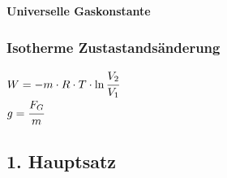 \textbf{Universelle Gaskonstante}\\
\begin{minipage}{0.45\textwidth}

\end{minipage}
\begin{minipage}{0.45\textwidth}


\end{minipage}


\subsubsection{Isotherme Zustastandsänderung}
\begin{minipage}{0.45\textwidth}


$W = -m \cdot R \cdot T \cdot \ln{\cfrac{V_2}{V_1}}$ \\
$g = \cfrac{F_G}{m}$

\end{minipage}
\begin{minipage}{0.45\textwidth}


\end{minipage}

\subsection{1. Hauptsatz}

